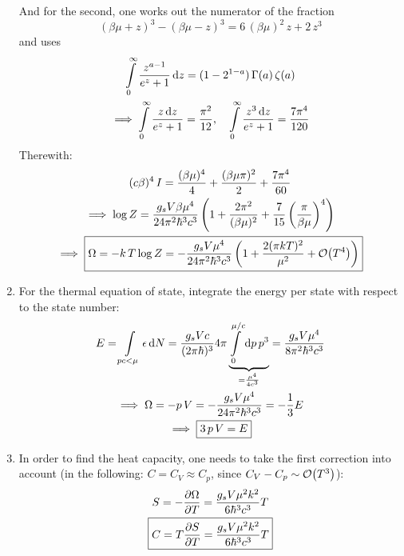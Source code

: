 \documentclass[11pt,a4paper]{scrartcl}
\newcommand{\gs}{g_{s}}
\begin{document}
\begin{enumerate}[label=\textbf{\large(\alph*)}, itemsep=2\baselineskip]
    And for the second, one works out the numerator of the fraction
    \begin{equation*}
        (\beta\mu+z)^3-(\beta\mu-z)^3=6\,(\beta\mu)^2\,z+2\,z^3
    \end{equation*}
    and uses
    \begin{gather*}
        \int\limits_{0}^{\infty}\frac{z^{a-1}}{e^z+1}\dd{z}=(1-2^{1-a})\,\Gamma(a)\,\zeta(a)
        \\
        \implies\int\limits_{0}^{\infty}\frac{z\dd{z}}{e^z+1}=\frac{\pi^2}{12}
        \qq*{,}
        \int\limits_{0}^{\infty}\frac{z^3\dd{z}}{e^z+1}=\frac{7\pi^4}{120}
    \end{gather*}
    Therewith:
    \begin{gather*}
        (c\beta)^4\,I=\frac{(\beta\mu)^4}{4}+\frac{(\beta\mu\pi)^2}{2}+\frac{7\pi^4}{60}
        \\
        \implies\log{Z}=\frac{\gs{V}\beta\mu^4}{24\pi^2\hbar^3c^3}\left(1+\frac{2\pi^2}{(\beta\mu)^2}+\frac{7}{15}\left(\frac{\pi}{\beta\mu}\right)^4\right)
        \\
        \implies\boxed{%
            \Omega=-k\,T\log{Z}=-\frac{\gs{V}\mu^4}{24\pi^2\hbar^3c^3}\left(1+\frac{2(\pi{k}T)^2}{\mu^2}+\order{T^4}\right)
        }
    \end{gather*}


\item
    For the thermal equation of state, integrate the energy per state with
    respect to the state number:
    \begin{gather*}
        E=\int\limits_{pc<\mu}\epsilon\dd{N}
        =\frac{\gs{V}c}{(2\pi\hbar)^3}4\pi
        \underbrace{%
            \int\limits_{0}^{\mu/c}\dd{p}p^3
        }_{=\frac{\mu^4}{4c^3}}
        =\frac{\gs{V}\mu^4}{8\pi^2\hbar^3c^3} \\
        \implies\Omega=-p\,V=-\frac{\gs{V}\mu^4}{24\pi^2\hbar^3c^3}=-\frac{1}{3}E
        \\
        \implies\boxed{3\,p\,V=E}
    \end{gather*}


\item
    In order to find the heat capacity, one needs to take the first correction
    into account (in the following: $C=C_V\approx C_p$, since
    $C_V-C_p\sim\order{T^3}$):
    \begin{gather*}
        S=-\pdv{\Omega}{T}=\frac{\gs{V}\mu^2k^2}{6\hbar^3c^3}T \\
        \boxed{C=T\pdv{S}{T}=\frac{\gs{V}\mu^2k^2}{6\hbar^3c^3}T}
    \end{gather*}

\end{enumerate}
\end{document}
